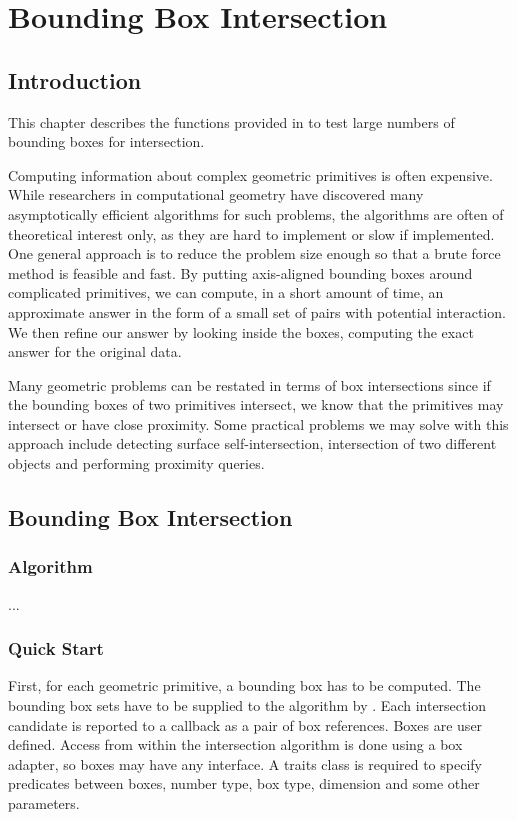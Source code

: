 \chapter*{Bounding Box Intersection}

\section*{Introduction}
This chapter describes the functions provided in \cgal{} 
to test large numbers of bounding boxes for intersection.

Computing information about complex geometric primitives is often expensive. While researchers in computational geometry have discovered many asymptotically efficient algorithms for such problems, the algorithms are often of theoretical interest only, as they are hard to implement or slow if implemented. One general approach is to reduce the problem size enough so that a brute force method is feasible and fast. By putting axis-aligned bounding boxes around complicated primitives, we can compute, in a short amount of time, an approximate answer in the form of a small set of pairs with potential interaction.  We then refine our answer by looking inside the boxes, computing the exact answer for the original data.

Many geometric problems can be restated in terms of box intersections since if the bounding boxes of two primitives intersect, we know that the primitives may intersect or have close proximity. Some practical problems we may solve with this approach include detecting surface self-intersection, intersection of two different objects and performing proximity queries. 

\section*{Bounding Box Intersection}
\subsection*{Algorithm}
...

\subsection*{Quick Start}
First, for each geometric primitive, a bounding box has to be computed. The bounding box sets have to be supplied to the algorithm by . Each intersection candidate is reported to a callback as a pair of box references. Boxes are user defined. Access from within the intersection algorithm is done using a box adapter, so boxes may have any interface. A traits class is required to specify predicates between boxes, number type, box type, dimension and some other parameters.

